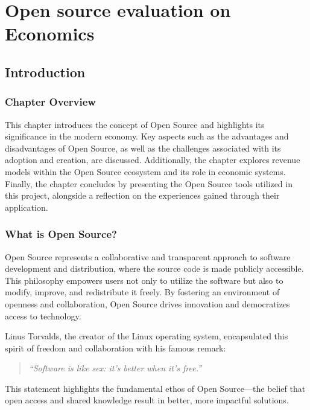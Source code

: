 \chapter{Open source evaluation on Economics}
\label{cha:Open_source_evaluation_Economics}

\section{Introduction}

\subsection{Chapter Overview}

This chapter introduces the concept of Open Source and highlights its significance in the modern economy. 
Key aspects such as the advantages and disadvantages of Open Source, as well as the challenges associated with its adoption and creation, are discussed. 
Additionally, the chapter explores revenue models within the Open Source ecosystem and its role in economic systems. 
Finally, the chapter concludes by presenting the Open Source tools utilized in this project, alongside a reflection on the experiences gained through their application.


\subsection{What is Open Source?}

Open Source represents a collaborative and transparent approach to software development and distribution, 
where the source code is made publicly accessible. This philosophy empowers users not only to utilize the software but also to modify, 
improve, and redistribute it freely. By fostering an environment of openness and collaboration, 
Open Source drives innovation and democratizes access to technology.

Linus Torvalds, the creator of the Linux operating system, encapsulated this spirit of freedom and collaboration with his famous remark:

\begin{quote}
    \textit{“Software is like sex: it's better when it's free.”}
    \author{Linus Torvalds}
\end{quote}

\cite{Linus_Torvalds_quote_open_source}

This statement highlights the fundamental ethos of Open Source—the belief that open access and shared knowledge result in better, more impactful solutions.


